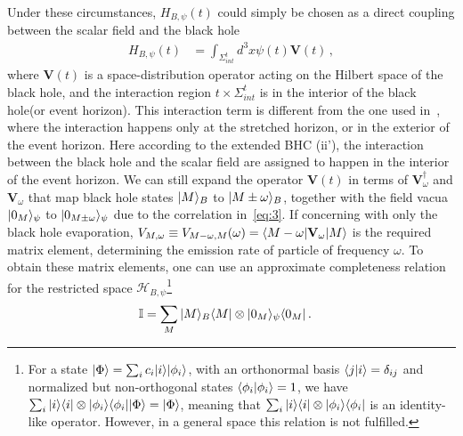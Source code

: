 \documentclass[12pt,a4paper]{article}
\begin{document}
Under these circumstances, $H_{B,\psi}(t)$ could simply be chosen as a direct coupling between the scalar field and the black hole
\begin{equation}
\label{eq:7}
\begin{split}
H_{B,\psi}(t) &= \int_{\Sigma_{int}^t} d^3x\psi(t)\mathbf{V}(t) \,,
\end{split}
\end{equation}
where $\mathbf{V}(t)$ is a space-distribution operator acting on the Hilbert space of the black hole, and the interaction region $t\times \Sigma_{int}^t$ is in the interior of
the black hole(or event horizon). This interaction term is different from the one used in~\cite{h}, where the interaction happens only at the stretched horizon, or in the exterior of the event horizon. Here according to the extended BHC (ii'), the interaction between the black hole and the scalar field are assigned to happen in the interior of the event horizon. We can still expand
the operator $\mathbf{V}(t)$ in terms of
$\mathbf{V}_{\omega}^{\dag}$ and $\mathbf{V}_{\omega}$ that map
black hole states $\arrowvert M\rangle_{B}$ to $\arrowvert
M\pm\omega\rangle_{B}$, together with the field vacua
$\arrowvert0_M\rangle_{\psi}$ to
$\arrowvert0_{M\pm\omega}\rangle_{\psi}$ due to the correlation
in~\eqref{eq:3}. If concerning with only the black hole evaporation,
$V_{M,\omega}\equiv V_{M-\omega,M}(\omega)=\langle
M-\omega\arrowvert\mathbf{V}_{\omega}\arrowvert M\rangle$ is the
required matrix element, determining the emission rate of particle
of frequency $\omega$. To obtain these matrix elements, one can use an approximate completeness
relation for the restricted space $\mathcal {H}_{B,\psi}$\footnote{For a state $\arrowvert\Phi\rangle=\sum_{i}c_i\arrowvert
i\rangle\arrowvert\phi_i\rangle$, with an orthonormal basis
$\langle j\arrowvert i\rangle=\delta_{ij}$ and normalized but
non-orthogonal states $\langle\phi_i\arrowvert\phi_i\rangle=1$, we
have $\sum_i\arrowvert i\rangle\langle
i|\otimes\arrowvert\phi_i\rangle\langle\phi_i\arrowvert\arrowvert\Phi\rangle=\arrowvert\Phi\rangle$,
meaning that $\sum_i\arrowvert i\rangle\langle
i\arrowvert\otimes\arrowvert\phi_i\rangle\langle\phi_i\arrowvert$ is
an identity-like operator. However, in a general space this relation
is not fulfilled.}
\begin{equation}
\label{eq:8}
\begin{split}
\mathbb{I} &= \sum_{M}\arrowvert M\rangle_B\langle
M\arrowvert\otimes\arrowvert 0_M\rangle_{\psi}\langle 0_M\arrowvert \,.
\end{split}
\end{equation}
\end{document}
